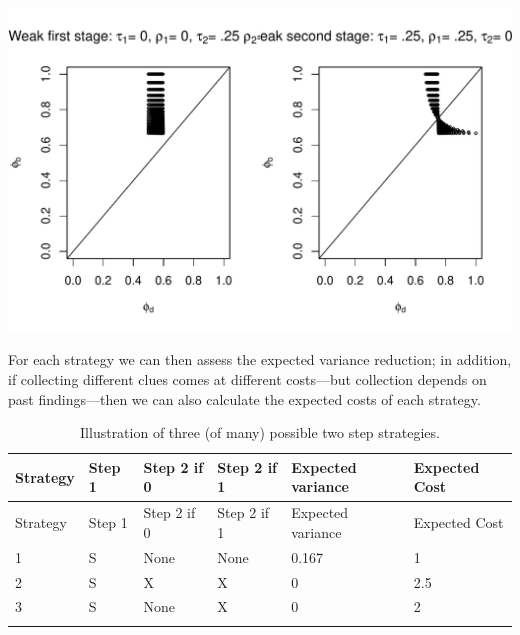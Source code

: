 \documentclass[12pt,]{book}
\newenvironment{Shaded}{\begin{snugshade}}{\end{snugshade}}
\newcommand{\CommentTok}[1]{\textcolor[rgb]{0.56,0.35,0.01}{\textit{#1}}}
\newcommand{\DataTypeTok}[1]{\textcolor[rgb]{0.13,0.29,0.53}{#1}}
\newcommand{\KeywordTok}[1]{\textcolor[rgb]{0.13,0.29,0.53}{\textbf{#1}}}
\newcommand{\NormalTok}[1]{#1}
\newcommand{\OperatorTok}[1]{\textcolor[rgb]{0.81,0.36,0.00}{\textbf{#1}}}
\newcommand{\OtherTok}[1]{\textcolor[rgb]{0.56,0.35,0.01}{#1}}
\newcommand{\StringTok}[1]{\textcolor[rgb]{0.31,0.60,0.02}{#1}}
\begin{document}
\begin{Shaded}
\end{Shaded}

\includegraphics{ii_files/figure-latex/unnamed-chunk-76-1.pdf}

For each strategy we can then assess the expected variance reduction; in addition, if collecting different clues comes at different costs---but collection depends on past findings---then we can also calculate the expected costs of each strategy.

\begin{longtable}[]{@{}llllll@{}}
\caption{Illustration of three (of many) possible two step strategies.}\tabularnewline
\toprule
Strategy & Step 1 & Step 2 if 0 & Step 2 if 1 & Expected variance & Expected Cost\tabularnewline
\midrule
\endfirsthead
\toprule
Strategy & Step 1 & Step 2 if 0 & Step 2 if 1 & Expected variance & Expected Cost\tabularnewline
\midrule
\endhead
1 & S & None & None & 0.167 & 1\tabularnewline
2 & S & X & X & 0 & 2.5\tabularnewline
3 & S & None & X & 0 & 2\tabularnewline
& & & & &\tabularnewline
\bottomrule
\end{longtable}
\end{document}
